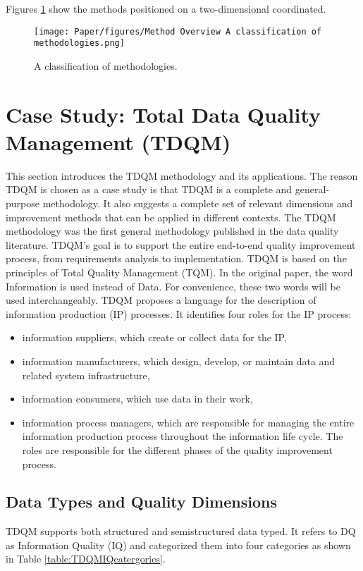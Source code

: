 \documentclass[pdftex,english,oribibl]{llncs}
\begin{document}
Figures \ref{fig:classificationMethodologies} show the methods positioned on a two-dimensional coordinated.

\begin{figure}
    \centering
    \texttt{[image: Paper/figures/Method Overview A classification of methodologies.png]}
    \caption{A classification of methodologies.}
    \label{fig:classificationMethodologies}
  \end{figure}

\section{Case Study: Total Data Quality Management (TDQM)}\label{sec:TDQM}
 \cite{Bowo2019CaseStudy}

This section introduces the TDQM methodology and its applications.  The reason TDQM is chosen as a case study is that TDQM is a complete and general-purpose methodology. It also suggests a complete set of relevant dimensions and improvement methods that can be applied in different contexts.
The TDQM methodology was the first general methodology published in the data quality literature. \cite{Wang1998TDQM}
TDQM's goal is to support the entire end-to-end quality improvement process, from requirements analysis to implementation.
TDQM is based on the principles of Total Quality Management (TQM). \cite{OAKLAND1999TQM}  In the original paper, the word Information is used instead of Data. For convenience, these two words will be used interchangeably. TDQM proposes a language for the description of information production (IP) processes.  It identifies four roles for the IP process:
\begin{itemize}
    \item information suppliers, which create or collect data for the IP,
    \item information manufacturers, which design, develop, or maintain data and related system infrastructure,
    \item information consumers, which use data in their work,
    \item information process managers, which are responsible for managing the entire information production process throughout the information life cycle.
The roles are responsible for the different phases of the quality improvement process.
\end{itemize}
\subsection{Data Types and Quality Dimensions}
TDQM supports both structured and semistructured data typed. It refers to DQ as Information Quality (IQ) and categorized them into four categories as shown in Table \ref{table:TDQMIQcatergories}.
\end{document}
